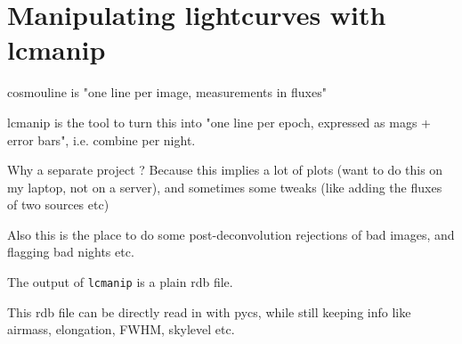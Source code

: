 


\section{Manipulating lightcurves with lcmanip}

cosmouline is "one line per image, measurements in fluxes"

lcmanip is the tool to turn this into "one line per epoch, expressed as mags + error bars", i.e. combine per night.

Why a separate project ? Because this implies a lot of plots (want to do this on my laptop, not on a server), and sometimes some tweaks (like adding the fluxes of two sources etc)

Also this is the place to do some post-deconvolution rejections of bad images, and flagging bad nights etc.

The output of \verb+lcmanip+ is a plain rdb file.

This rdb file can be directly read in with pycs, while still keeping info like airmass, elongation, FWHM, skylevel etc.